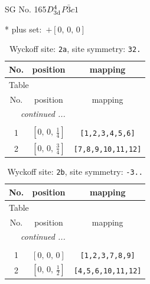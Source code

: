 \documentclass[fleqn,8pt]{jsarticle}
\begin{document}
\setcounter{MaxMatrixCols}{32}

\renewcommand{\tablename}{Table~}
\renewcommand{\figurename}{Figure~}
\begin{center}
\LARGE
SG No. 165\quad$D_{\rm 3d}^{4}$\quad$P\bar{3}c1$\quad[ trigonal ]
\end{center}
* plus set:\,\,\,$+\left[ 0,\, 0,\, 0 \right]$
\renewcommand{\arraystretch}{1.2}
\begin{longtable}{ccc}
\caption{Wyckoff site: {\tt 2a}, site symmetry: {\tt 32.}}
 \\
 \hline \hline
No. & position & mapping \\ \hline \endfirsthead

\multicolumn{2}{l}{\tablename\ \thetable{}} \\
 \hline \hline
No. & position & mapping \\ \hline \endhead

 \hline \hline
\multicolumn{2}{r}{\footnotesize\it continued ...} \\ \endfoot

 \hline \hline
\multicolumn{2}{r}{} \\ \endlastfoot

1 & $\left[ 0,\, 0,\, \frac{1}{4} \right]$ & {\tt [1,2,3,4,5,6]} \\ \hline
2 & $\left[ 0,\, 0,\, \frac{3}{4} \right]$ & {\tt [7,8,9,10,11,12]} \\
\end{longtable}
\renewcommand{\arraystretch}{1.2}
\begin{longtable}{ccc}
\caption{Wyckoff site: {\tt 2b}, site symmetry: {\tt -3..}}
 \\
 \hline \hline
No. & position & mapping \\ \hline \endfirsthead

\multicolumn{2}{l}{\tablename\ \thetable{}} \\
 \hline \hline
No. & position & mapping \\ \hline \endhead

 \hline \hline
\multicolumn{2}{r}{\footnotesize\it continued ...} \\ \endfoot

 \hline \hline
\multicolumn{2}{r}{} \\ \endlastfoot

1 & $\left[ 0,\, 0,\, 0 \right]$ & {\tt [1,2,3,7,8,9]} \\ \hline
2 & $\left[ 0,\, 0,\, \frac{1}{2} \right]$ & {\tt [4,5,6,10,11,12]} \\
\end{longtable}
\end{document}
